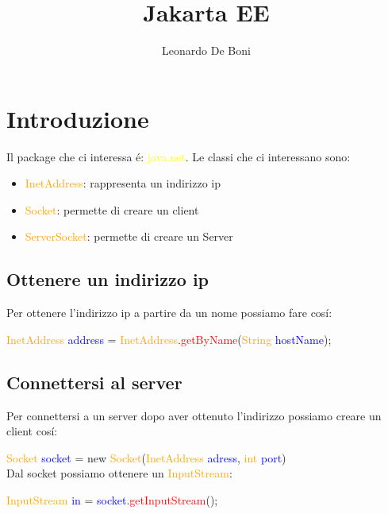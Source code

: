 \documentclass[11pt, letterpaper, titlepage]{article}
\begin{document}
\title{Jakarta EE}
\author{Leonardo De Boni}
\maketitle
\tableofcontents
\newpage

\section{Introduzione}
Il package che ci interessa \'{e}: \textcolor{yellow}{java.net}. Le classi che ci interessano sono:
\begin{itemize}
    \item \textcolor{orange}{InetAddress}: rappresenta un indirizzo ip
    \item \textcolor{orange}{Socket}: permette di creare un client
    \item \textcolor{orange}{ServerSocket}: permette di creare un Server
\end{itemize}

\subsection{Ottenere un indirizzo ip}
Per ottenere l'indirizzo ip a partire da un nome possiamo fare cos\'{i}:\par
\textcolor{orange}{InetAddress} \textcolor{blue}{address} = \textcolor{orange}{InetAddress}.\textcolor{red}{getByName}(\textcolor{orange}{String} \textcolor{blue}{hostName});

\subsection{Connettersi al server}
Per connettersi a un server dopo aver ottenuto l'indirizzo possiamo creare un client cos\'{i}:\par
\textcolor{orange}{Socket} \textcolor{blue}{socket}  = new \textcolor{orange}{Socket}(\textcolor{orange}{InetAddress} \textcolor{blue}{adress}, \textcolor{orange}{int} \textcolor{blue}{port})\\
Dal socket possiamo ottenere un \textcolor{orange}{InputStream}:\par
\textcolor{orange}{InputStream} \textcolor{blue}{in} = \textcolor{blue}{socket}.\textcolor{red}{getInputStream}();
\end{document}
